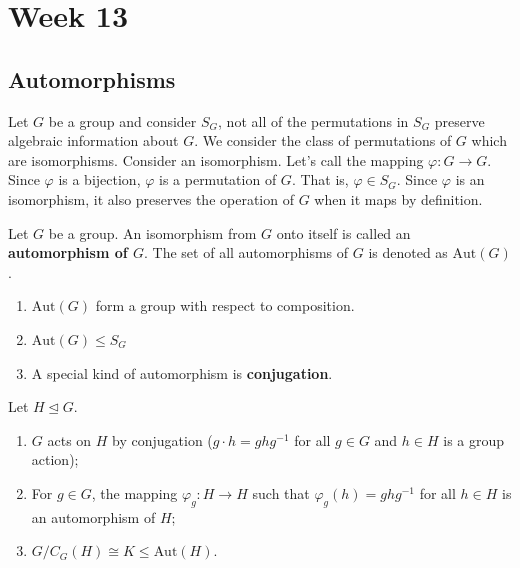 \section{Week 13}

\subsection{Automorphisms}

Let \( G  \) be a group and consider \( {S}_{G} \), not all of the permutations in \( {S}_{G} \) preserve algebraic information about \( G \). We consider the class of permutations of \( G  \) which are isomorphisms. Consider an isomorphism. Let's call the mapping \( \varphi : G \to G  \). Since \( \varphi  \) is a bijection, \( \varphi  \) is a permutation of \( G  \). That is, \( \varphi \in {S}_{G} \). Since \( \varphi  \) is an isomorphism, it also preserves the operation of \( G  \) when it maps by definition.  

\begin{definition}[ ]
    Let \( G  \) be a group. An isomorphism from \( G  \) onto itself is called an \textbf{automorphism of \( G  \)}. The set of all automorphisms of \( G  \) is denoted as \( \text{Aut}(G) \).
\end{definition}

\begin{remark}
   \begin{enumerate}
       \item[(1)] \( \text{Aut}(G) \) form a group with respect to composition. 
        \item[(2)] \( \text{Aut}(G) \leq {S}_{G} \) 
        \item[(3)] A special kind of automorphism is \textbf{conjugation}.
   \end{enumerate} 
\end{remark}

\begin{prop}
    Let \( H \trianglelefteq G  \). 
    \begin{enumerate}
        \item[(1)] \( G  \) acts on \( H  \) by conjugation (\( g \cdot h = g h g^{-1} \) for all \( g \in G  \) and \( h \in H  \) is a group action);
        \item[(2)] For \( g \in G  \), the mapping \( {\varphi}_{g} : H \to H  \) such that \( {\varphi}_{g}(h) = g h g^{-1} \) for all \( h \in H  \) is an automorphism of \( H  \);
        \item[(3)] \( G / {C}_{G}(H) \cong K \leq \text{Aut}(H) \).
    \end{enumerate}
\end{prop}

